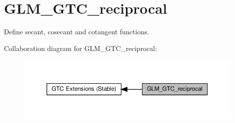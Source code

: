 \hypertarget{group__gtc__reciprocal}{}\section{G\+L\+M\+\_\+\+G\+T\+C\+\_\+reciprocal}
\label{group__gtc__reciprocal}


Define secant, cosecant and cotangent functions.  


Collaboration diagram for G\+L\+M\+\_\+\+G\+T\+C\+\_\+reciprocal\+:\nopagebreak
\begin{figure}[H]
\begin{center}
\leavevmode
\includegraphics[width=350pt]{group__gtc__reciprocal}
\end{center}
\end{figure}
